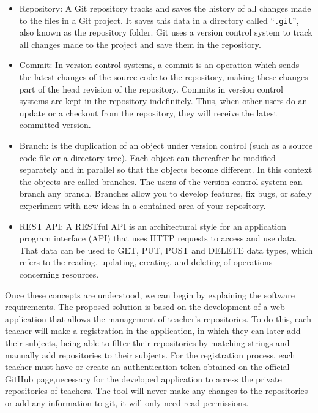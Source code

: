 \begin{itemize}
\item Repository: A Git repository tracks and saves the history of all
  changes made to the files in a Git project. It saves this data in a
  directory called ``{\tt .git}'', also known as the repository folder. Git
  uses a version control system to track all changes made to the project
  and save them in the repository.

\item Commit: In version control systems, a commit is an operation which
  sends the latest changes of the source code to the repository, making
  these changes part of the head revision of the repository. Commits in
  version control systems are kept in the repository indefinitely. Thus,
  when other users do an update or a checkout from the repository, they
  will receive the latest committed version.

\item Branch: is the duplication of an object under version control (such
  as a source code file or a directory tree). Each object can thereafter be
  modified separately and in parallel so that the objects become different.
  In this context the objects are called branches. The users of the version
  control system can branch any branch. Branches allow you to develop
  features, fix bugs, or safely experiment with new ideas in a contained
  area of your repository.

\item REST API: A RESTful API is an architectural style for an application
  program interface (API) that uses HTTP requests to access and use data.
  That data can be used to GET, PUT, POST and DELETE data types, which
  refers to the reading, updating, creating, and deleting of operations
  concerning resources.
\end{itemize}

Once these concepts are understood, we can begin by explaining the software
requirements. The proposed solution is based on the development of a web
application that allows the management of teacher’s repositories. To do
this, each teacher will make a registration in the application, in which
they can later add their subjects, being able to filter their repositories
by matching strings and manually add repositories to their subjects. For
the registration process, each teacher must have or create an
authentication token obtained on the official GitHub page,necessary for the
developed application to access the private repositories of teachers. The
tool will never make any changes to the repositories or add any information
to git, it will only need read permissions.

